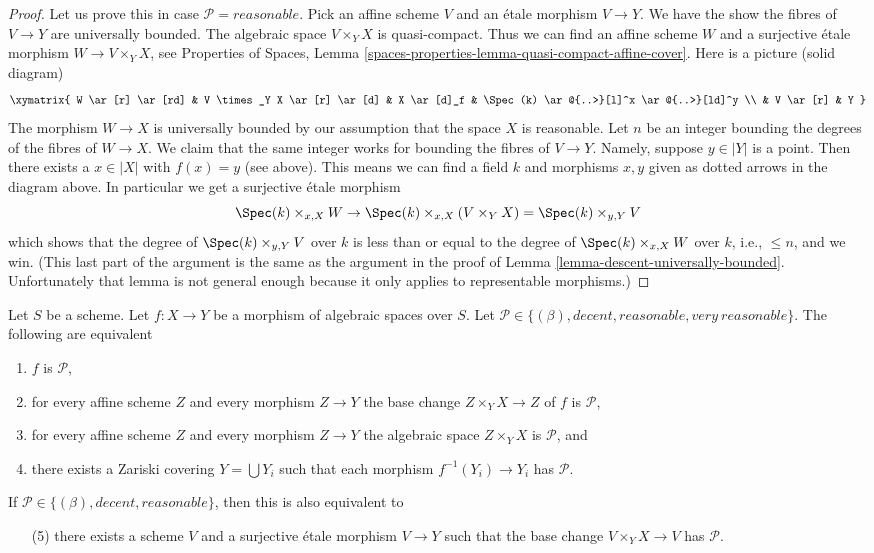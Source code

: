 \begin{proof}
\medskip\noindent
Let us prove this in case $\mathcal{P} = reasonable$.
Pick an affine scheme $V$ and an \'etale morphism $V \to Y$.
We have the show the fibres of $V \to Y$ are universally bounded.
The algebraic space $V \times_Y X$ is quasi-compact.
Thus we can find an affine scheme $W$ and a surjective \'etale morphism
$W \to V \times_Y X$, see
Properties of Spaces,
Lemma \ref{spaces-properties-lemma-quasi-compact-affine-cover}.
Here is a picture (solid diagram)
$$
\xymatrix{
W \ar[r]  \ar[rd] &
V \times_Y X \ar[r] \ar[d] &
X \ar[d]_f & \Spec(k) \ar@{..>}[l]^x \ar@{..>}[ld]^y \\
 & V \ar[r] & Y
}
$$
The morphism $W \to X$ is universally bounded by our assumption that
the space $X$ is reasonable. Let $n$ be an integer bounding
the degrees of the fibres of $W \to X$. We claim that the same integer
works for bounding the fibres of $V \to Y$. Namely, suppose $y \in |Y|$
is a point. Then there exists a $x \in |X|$ with $f(x) = y$ (see above).
This means we can find a field $k$ and morphisms $x, y$ given as dotted
arrows in the diagram above. In particular we get a surjective \'etale
morphism
$$
\Spec(k) \times_{x, X} W
\to
\Spec(k) \times_{x, X} (V \times_Y X) = \Spec(k) \times_{y, Y} V
$$
which shows that the degree of $\Spec(k) \times_{y, Y} V$ over $k$
is less than or equal to the degree of $\Spec(k) \times_{x, X} W$
over $k$, i.e., $\leq n$, and we win. (This last part of the argument
is the same as the argument in the proof of
Lemma \ref{lemma-descent-universally-bounded}.
Unfortunately that lemma is not general enough because it only applies
to representable morphisms.)
\end{proof}

\begin{lemma}
\label{lemma-relative-conditions-local}
Let $S$ be a scheme.
Let $f : X \to Y$ be a morphism of algebraic spaces over $S$.
Let $\mathcal{P} \in \{(\beta), decent, reasonable, very\ reasonable\}$.
The following are equivalent
\begin{enumerate}
\item $f$ is $\mathcal{P}$,
\item for every affine scheme $Z$ and every morphism $Z \to Y$ the
base change $Z \times_Y X \to Z$ of $f$ is $\mathcal{P}$,
\item for every affine scheme $Z$ and every morphism $Z \to Y$ the
algebraic space $Z \times_Y X$ is $\mathcal{P}$, and
\item there exists a Zariski covering $Y = \bigcup Y_i$ such
that each morphism $f^{-1}(Y_i) \to Y_i$ has $\mathcal{P}$.
\end{enumerate}
If $\mathcal{P} \in \{(\beta), decent, reasonable\}$, then this is also
equivalent to
\begin{enumerate}
\item[(5)] there exists a scheme $V$ and a surjective \'etale morphism
$V \to Y$ such that the base change $V \times_Y X \to V$ has
$\mathcal{P}$.
\end{enumerate}
\end{lemma}

